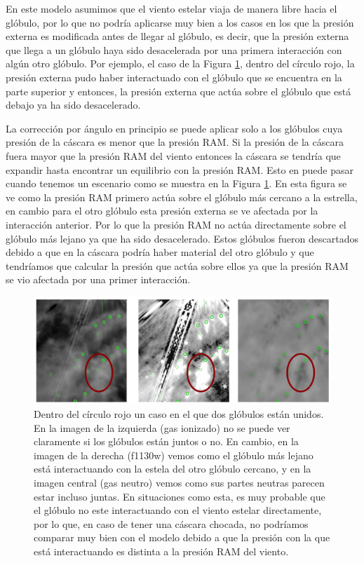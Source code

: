 \documentclass{book}
\begin{document}
En este modelo asumimos que el viento estelar viaja de manera libre hacia el glóbulo, por lo que no podría aplicarse muy bien a los casos en los que la presión externa es modificada antes de llegar al glóbulo, es decir, que la presión externa que llega a un glóbulo haya sido desacelerada por una primera interacción con algún otro glóbulo. Por ejemplo, el caso de la Figura \ref{fig:multiples_glo}, dentro del círculo rojo, la presión externa pudo haber interactuado con el glóbulo que se encuentra en la parte superior y entonces, la presión externa que actúa sobre el glóbulo que está debajo ya ha sido desacelerado.

La corrección por ángulo en principio se puede aplicar solo a los glóbulos cuya presión de la cáscara  es menor que la presión RAM. Si la presión de la cáscara fuera mayor que la presión RAM del viento entonces la cáscara se tendría que expandir hasta encontrar un equilibrio con la presión RAM. Esto en puede pasar cuando tenemos un escenario como se muestra en la Figura \ref{fig:multiples_glo}. En esta figura se ve como la presión RAM primero actúa sobre el glóbulo más cercano a la estrella, en cambio para el otro glóbulo esta presión externa se ve afectada por la interacción anterior. Por lo que la presión RAM no actúa directamente sobre el glóbulo más lejano ya que ha sido desacelerado. Estos glóbulos fueron descartados debido a que en la cáscara podría haber material del otro glóbulo y que tendríamos que calcular la presión que actúa sobre ellos ya que la presión RAM se vio afectada por una primer interacción.\\

\begin{figure}[htb]
    \centering
    \includegraphics[width=\textwidth]{Nuevas imagenes finales/multiples_glo.pdf}
    \caption{Dentro del círculo rojo un caso en el que dos glóbulos están unidos. En la imagen de la izquierda (gas ionizado) no se puede ver claramente si los glóbulos están juntos o no.  En cambio, en la imagen de la derecha (f1130w) vemos como el glóbulo más lejano está interactuando con la estela del otro glóbulo cercano, y en la imagen central (gas neutro) vemos como sus partes neutras parecen estar incluso juntas. En situaciones como esta, es muy probable que el glóbulo no este interactuando con el viento estelar directamente, por lo que, en caso de tener una cáscara chocada, no podríamos comparar muy bien con el modelo debido a que la presión con la que está interactuando es distinta a la presión RAM del viento.}
    \label{fig:multiples_glo}
\end{figure}
\end{document}
